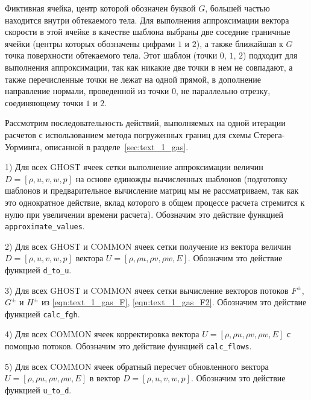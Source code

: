 
Фиктивная ячейка, центр которой обозначен буквой $G$, большей частью находится внутри обтекаемого тела.
Для выполнения аппроксимации вектора скорости в этой ячейке в качестве шаблона выбраны две соседние граничные ячейки (центры которых обозначены цифрами $1$ и $2$), а также ближайшая к $G$ точка поверхности обтекаемого тела.
Этот шаблон (точки $0$, $1$, $2$) подходит для выполнения аппроксимации, так как никакие две точки в нем не совпадают, а также перечисленные точки не лежат на одной прямой, в дополнение направление нормали, проведенной из точки $0$, не параллельно отрезку, соединяющему точки $1$ и $2$.


Рассмотрим последовательность действий, выполняемых на одной итерации расчетов с использованием метода погруженных границ для схемы Стерега-Уорминга, описанной в разделе~\ref{sec:text_1_gas}.

1) Для всех GHOST ячеек сетки выполнение аппроксимации величин $D = [\rho, u, v, w, p]$ на основе единожды вычисленных шаблонов (подготовку шаблонов и предварительное вычисление матриц мы не рассматриваем, так как это однократное действие, вклад которого в общем процессе расчета стремится к нулю при увеличении времени расчета).
Обозначим это действие функцией \texttt{approximate\_values}.

2) Для всех GHOST и COMMON ячеек сетки получение из вектора величин $D = [\rho, u, v, w, p]$ вектора $U = [\rho, \rho u, \rho v, \rho w, E]$.
Обозначим это действие функцией \texttt{d\_to\_u}.

3) Для всех GHOST и COMMON ячеек сетки вычисление векторов потоков $F^{\pm}$, $G^{\pm}$ и $H^{\pm}$ из \eqref{eqn:text_1_gas_F}, \eqref{eqn:text_1_gas_F2}.
Обозначим это действие функцией \texttt{calc\_fgh}.

4) Для всех COMMON ячеек корректировка вектора $U = [\rho, \rho u, \rho v, \rho w, E]$ с помощью потоков.
Обозначим это действие функцией \texttt{calc\_flows}.

5) Для всех COMMON ячеек обратный пересчет обновленного вектора $U = [\rho, \rho u, \rho v, \rho w, E]$ в вектор $D = [\rho, u, v, w, p]$.
Обозначим это действие функцией \texttt{u\_to\_d}.

